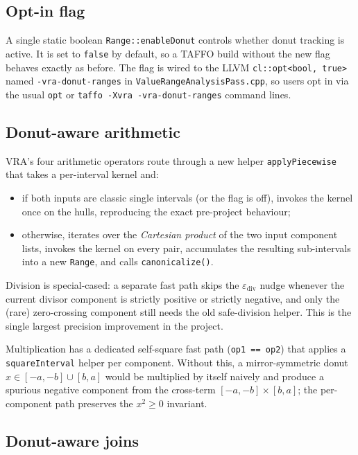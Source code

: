 \documentclass[11pt,a4paper]{article}
\theoremstyle{plain}
\begin{document}
\subsection{Opt-in flag}

A single static boolean \texttt{Range::enableDonut} controls whether
donut tracking is active. It is set to \texttt{false} by default, so a
TAFFO build without the new flag behaves exactly as before. The flag
is wired to the LLVM \texttt{cl::opt<bool, true>} named
\texttt{-vra-donut-ranges} in \texttt{ValueRangeAnalysisPass.cpp}, so
users opt in via the usual \texttt{opt} or
\texttt{taffo -Xvra -vra-donut-ranges} command lines.

\subsection{Donut-aware arithmetic}
\label{sec:design-arith}

VRA's four arithmetic operators route through a new helper
\texttt{applyPiecewise} that takes a per-interval kernel and:
\begin{itemize}
\item if both inputs are classic single intervals (or the flag is
      off), invokes the kernel once on the hulls, reproducing the
      exact pre-project behaviour;
\item otherwise, iterates over the \emph{Cartesian product} of the two
      input component lists, invokes the kernel on every pair,
      accumulates the resulting sub-intervals into a new
      \texttt{Range}, and calls \texttt{canonicalize()}.
\end{itemize}

Division is special-cased: a separate fast path skips the
$\varepsilon_{\text{div}}$ nudge whenever the current divisor component
is strictly positive or strictly negative, and only the (rare)
zero-crossing component still needs the old safe-division helper. This
is the single largest precision improvement in the project.

Multiplication has a dedicated self-square fast path (\texttt{op1 == op2})
that applies a \texttt{squareInterval} helper per component. Without
this, a mirror-symmetric donut $x\in[-a,-b]\cup[b,a]$ would be
multiplied by itself naively and produce a spurious negative component
from the cross-term $[-a,-b]\times[b,a]$; the per-component path
preserves the $x^2\ge 0$ invariant.

\subsection{Donut-aware joins}
\end{document}
